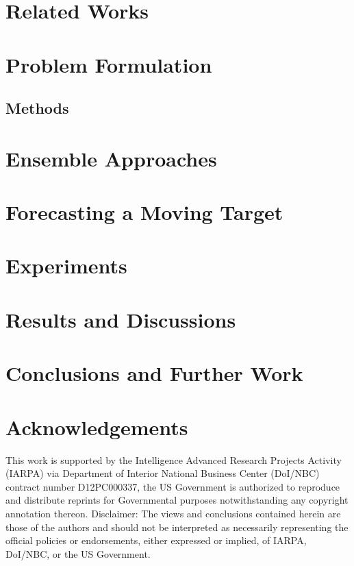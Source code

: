 \documentclass[twoside,leqno,twocolumn]{article}
\begin{document}
\section{\label{sec:related}Related Works}


\section{\label{sec:problem} Problem Formulation}

 
\subsection{\label{sec:methods} Methods}


\section{\label{sec:ensemble} Ensemble Approaches}


\section{\label{sec:moving} Forecasting a Moving Target}


\section{\label{sec:experiments} Experiments}


\section{\label{sec:results} Results and Discussions}


\section{\label{sec:conclusions} Conclusions and Further Work}


\section*{Acknowledgements}
This work is supported by the Intelligence Advanced Research Projects Activity
(IARPA) via Department of Interior National Business Center (DoI/NBC)
contract number D12PC000337, the US Government is authorized to
reproduce and distribute reprints for Governmental purposes
notwithstanding any copyright annotation thereon. Disclaimer: The
views and conclusions contained herein are those of the authors and
should not be interpreted as necessarily representing the official
policies or endorsements, either expressed or implied, of IARPA,
DoI/NBC, or the US Government.
\end{document}
